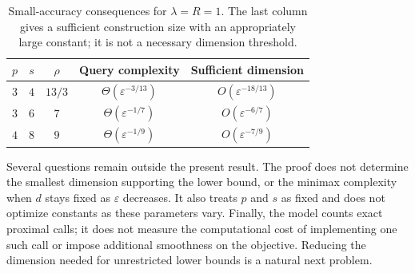 \documentclass[11pt]{article}
\theoremstyle{definition}
\theoremstyle{remark}
\newcommand{\eps}{\varepsilon}
\begin{document}
\begin{table}[htbp]
\centering
\small
\renewcommand{\arraystretch}{1.15}
\begin{tabular}{@{}ccccc@{}}
\toprule
$p$ & $s$ & $\rho$ & Query complexity & Sufficient dimension\\
\midrule
$3$ & $4$ & $13/3$ & $\Theta(\eps^{-3/13})$ & $O(\eps^{-18/13})$\\
$3$ & $6$ & $7$ & $\Theta(\eps^{-1/7})$ & $O(\eps^{-6/7})$\\
$4$ & $8$ & $9$ & $\Theta(\eps^{-1/9})$ & $O(\eps^{-7/9})$\\
\bottomrule
\end{tabular}
\caption{Small-accuracy consequences for $\lambda=R=1$.
The last column gives a sufficient construction size with an appropriately
large constant; it is not a necessary dimension threshold.}
\label{tab:examples}
\end{table}

Several questions remain outside the present result. The proof does
not determine the smallest dimension supporting the lower bound, or
the minimax complexity when $d$ stays fixed as $\eps$ decreases.
It also treats $p$ and $s$ as fixed and does not optimize constants
as these parameters vary. Finally, the model counts exact proximal
calls; it does not measure the computational cost of implementing
one such call or impose additional smoothness on the objective.
Reducing the dimension needed for unrestricted lower bounds is a
natural next problem.
\end{document}
